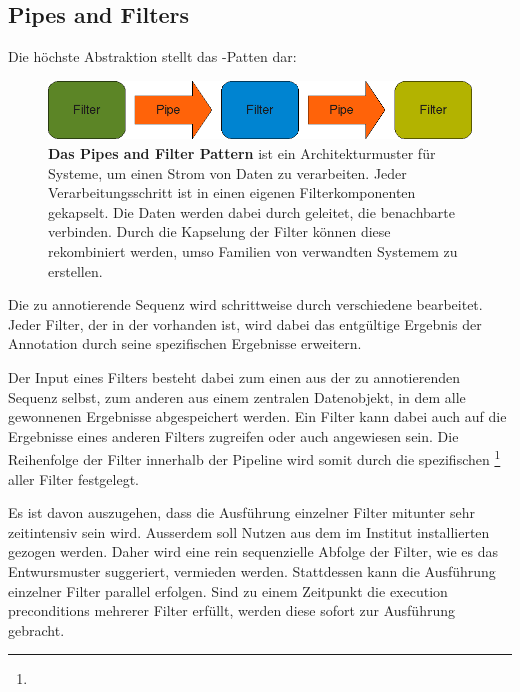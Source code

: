\subsection{Pipes and Filters}
Die höchste Abstraktion stellt das -Patten dar:

\begin{figure}[htbp]
	\begin{center}
		\includegraphics[scale=0.7]{pics/pipesFilter3.png}
	\caption[Pipes and Filter]{
	\textbf{Das Pipes and Filter Pattern}
	ist ein Architekturmuster für Systeme, um einen Strom von Daten zu
	verarbeiten.
	Jeder Verarbeitungsschritt ist in einen eigenen Filterkomponenten gekapselt.
	Die Daten werden dabei durch  geleitet, die benachbarte
	 verbinden.
	Durch die Kapselung der Filter können diese rekombiniert werden, umso Familien
	von verwandten Systemem zu erstellen.
	\citep{buschmann_pattern-oriented_1996}}
	\end{center}
	\label{fig:pipesFilter}
\end{figure}

Die zu annotierende Sequenz wird schrittweise durch verschiedene 
bearbeitet. Jeder Filter, der in der  vorhanden ist, wird dabei
das entgültige Ergebnis der Annotation durch seine spezifischen Ergebnisse
erweitern.

Der Input eines Filters besteht dabei zum einen aus der zu
annotierenden Sequenz selbst, zum anderen aus einem zentralen Datenobjekt, in
dem alle gewonnenen Ergebnisse abgespeichert werden.
Ein Filter kann dabei auch auf die Ergebnisse eines anderen
Filters zugreifen oder auch angewiesen sein.
Die Reihenfolge der Filter innerhalb der Pipeline wird
somit durch die spezifischen 
\footnote{}
aller Filter festgelegt.

Es ist davon auszugehen, dass die Ausführung einzelner Filter mitunter sehr
zeitintensiv sein wird. Ausserdem soll Nutzen aus dem im Institut installierten
 gezogen werden. Daher wird eine rein sequenzielle Abfolge der
Filter, wie es das Entwursmuster suggeriert, vermieden werden.
Stattdessen kann die Ausführung einzelner Filter parallel erfolgen.
Sind zu einem Zeitpunkt die execution preconditions mehrerer Filter erfüllt,
werden diese sofort zur Ausführung gebracht.

